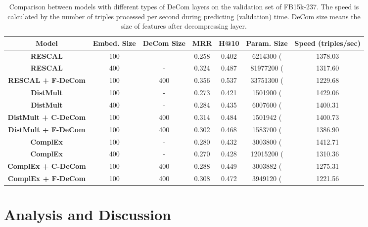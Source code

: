 \documentclass[letterpaper]{article} \usepackage{aaai20}  \usepackage{times}  \usepackage{helvet} \usepackage{courier}  \usepackage{booktabs}
\begin{document}
\begin{table*}[t]
    \centering
    \begin{tabular}{|c|cc|cccc|}
    \toprule
      Model & Embed. Size & DeCom Size & MRR &  H@10 & Param. Size  & Speed (triples/sec)\\
        \midrule
        \textbf{RESCAL} & 100 & - & 0.258 & 0.402 & 6214300 ( & 1378.03 \\
        \textbf{RESCAL} & 400 & - & 0.324 & 0.487 & 81977200 ( & 1317.60\\
\textbf{RESCAL + F-DeCom} & 100 & 400 & 0.356 & 0.537 & 33751300 ( & 1229.68\\
        \midrule
        \textbf{DistMult} & 100 & - & 0.273 & 0.421 & 1501900 ( & 1429.06\\
        \textbf{DistMult} & 400 & - & 0.284 & 0.435 & 6007600 ( &1400.31\\
        \textbf{DistMult + C-DeCom} & 100 & 400 & 0.314 & 0.484  & 1501942 ( & 1400.73\\
        \textbf{DistMult + F-DeCom} & 100 & 400 & 0.302 & 0.468 & 1583700 ( & 1386.90\\
        \midrule
        \textbf{ComplEx} & 100 & - & 0.280& 0.432& 3003800 ( & 1412.71\\
        \textbf{ComplEx} & 400 & - & 0.270& 0.428& 12015200 ( &1310.36\\
        \textbf{ComplEx + C-DeCom} & 100 & 400& 0.288& 0.449& 3003882 ( & 1275.31\\
        \textbf{ComplEx + F-DeCom} &  100 & 400 & 0.308 & 0.472 & 3949120 ( & 1221.56\\
        \bottomrule
    \end{tabular}
    \caption{Comparison between models with different types of DeCom layers on the validation set of FB15k-237. The speed is calculated by the number of triples processed per second during predicting (validation) time. DeCom size means the size of features after decompressing layer.}
    \label{tab:param-time}
    \vspace{-3mm}
\end{table*}

\section{Analysis and Discussion}
\end{document}
